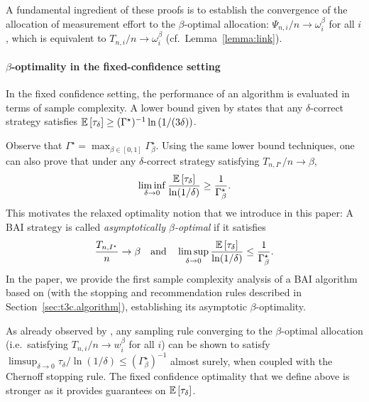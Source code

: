 A fundamental ingredient of these proofs is to establish the convergence of the allocation of measurement effort to the $\beta$-optimal allocation: $\Psi_{n,i}/n \rightarrow \omega_{i}^\beta$ for all $i$, which is equivalent to $T_{n,i}/n \rightarrow \omega_{i}^\beta$ (cf.\ Lemma~\ref{lemma:link}).

\paragraph{$\beta$-optimality in the fixed-confidence setting} In the fixed confidence setting, the performance of an algorithm is evaluated in terms of sample complexity. A lower bound given by \cite{garivier2016tracknstop} states that any $\delta$-correct strategy satisfies $\mathbb{E}\left[\tau_\delta\right] \geq (\Gamma^\star)^{-1} \ln \left({1}/(3\delta)\right)$. 

Observe that $\Gamma^\star = \max_{\beta \in [0,1]} \Gamma_\beta^\star$. Using the same lower bound techniques, one can also prove that under any $\delta$-correct strategy satisfying $T_{n,I^\star}/n \rightarrow \beta$,
\[\liminf_{\delta \rightarrow 0}\frac{\mathbb{E}\left[\tau_\delta\right]}{\ln(1/\delta)} \geq \frac{1}{\Gamma^\star_\beta}.\]
This motivates the relaxed optimality notion that we introduce in this paper: A BAI strategy is called \emph{asymptotically $\beta$-optimal} if it satisfies 
\[\frac{T_{n,I^\star}}{n}\rightarrow \beta \ \ \ \text{and} \ \ \ \limsup_{\delta \rightarrow 0}\frac{\EE{\tau_\delta}}{\ln(1/\delta)} \leq \frac{1}{\Gamma^\star_\beta}.\]
In the paper, we provide the first sample complexity analysis of a BAI algorithm based on \TTTS (with the stopping and recommendation rules described in Section~\ref{sec:t3c.algorithm}), establishing its asymptotic $\beta$-optimality.

As already observed by \cite{qin2017ttei}, any sampling rule converging to the $\beta$-optimal allocation (i.e.\ satisfying $T_{n,i}/n \rightarrow w_i^\beta$ for all $i$) can be shown to satisfy $\limsup_{\delta \rightarrow 0} \tau_\delta/\ln(1/\delta) \leq (\Gamma_\beta^\star)^{-1}$ almost surely,  when coupled with the Chernoff stopping rule. The fixed confidence optimality that we define above is stronger as it provides guarantees on $\mathbb{E}\left[\tau_\delta\right]$.

